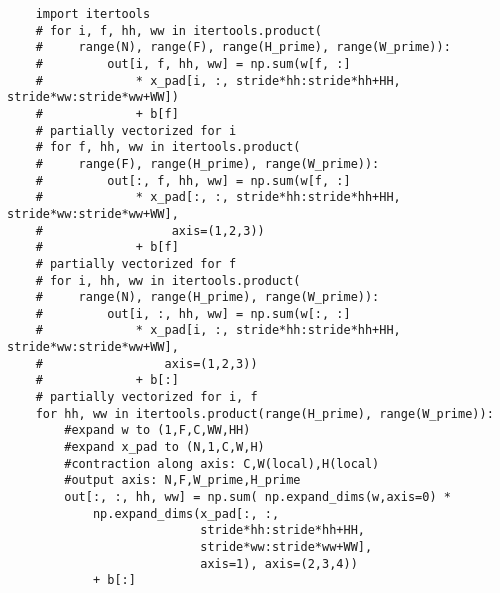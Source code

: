 \documentclass[12pt,letter]{article}
\begin{document}
\begin{enumerate}
\begin{verbatim}
    import itertools
    # for i, f, hh, ww in itertools.product(
    #     range(N), range(F), range(H_prime), range(W_prime)):
    #         out[i, f, hh, ww] = np.sum(w[f, :]
    #             * x_pad[i, :, stride*hh:stride*hh+HH, stride*ww:stride*ww+WW]) 
    #             + b[f]
    # partially vectorized for i
    # for f, hh, ww in itertools.product(
    #     range(F), range(H_prime), range(W_prime)):
    #         out[:, f, hh, ww] = np.sum(w[f, :] 
    #             * x_pad[:, :, stride*hh:stride*hh+HH, stride*ww:stride*ww+WW],
    #                  axis=(1,2,3))
    #             + b[f]
    # partially vectorized for f
    # for i, hh, ww in itertools.product(
    #     range(N), range(H_prime), range(W_prime)):
    #         out[i, :, hh, ww] = np.sum(w[:, :] 
    #             * x_pad[i, :, stride*hh:stride*hh+HH, stride*ww:stride*ww+WW],
    #                 axis=(1,2,3))
    #             + b[:]
    # partially vectorized for i, f
    for hh, ww in itertools.product(range(H_prime), range(W_prime)):
        #expand w to (1,F,C,WW,HH)
        #expand x_pad to (N,1,C,W,H)
        #contraction along axis: C,W(local),H(local)
        #output axis: N,F,W_prime,H_prime
        out[:, :, hh, ww] = np.sum( np.expand_dims(w,axis=0) *
            np.expand_dims(x_pad[:, :, 
                           stride*hh:stride*hh+HH, 
                           stride*ww:stride*ww+WW],
                           axis=1), axis=(2,3,4))
            + b[:]
\end{verbatim}
\end{enumerate}
\end{document}
